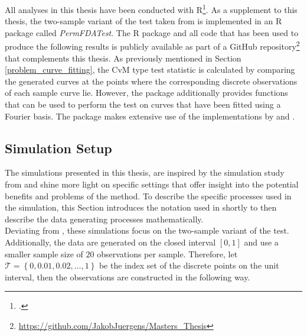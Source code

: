 \documentclass[12pt, a4paper]{article}
\theoremstyle{MAstyle} \newtheorem{assumption}{Assumption}[section]
\theoremstyle{MAstyle} \newtheorem{definition}{Definition}[section]
\theoremstyle{MAstyle} \newtheorem{theorem}{Theorem}[section]
\begin{document}
		All analyses in this thesis have been conducted with R\footcite{R}. As a supplement to this thesis, the two-sample variant of the test taken from \cite{bugni_permutation_2021} is implemented in an R package called \textit{PermFDATest}. The R package and all code that has been used to produce the following results is publicly available as part of a GitHub repository\footnote{\href{https://github.com/JakobJuergens/Masters_Thesis}{https://github.com/JakobJuergens/Masters\_Thesis}} that complements this thesis. As previously mentioned in Section \ref{problem_curve_fitting}, the CvM type test statistic is calculated by comparing the generated curves at the points where the corresponding discrete observations of each sample curve lie. However, the package additionally provides functions that can be used to perform the test on curves that have been fitted using a Fourier basis.
		The package makes extensive use of the implementations by \cite{fda} and \cite{tidyverse}.

		\subsection{Simulation Setup}
		The simulations presented in this thesis, are inspired by the simulation study from \cite{bugni_permutation_2021} and shine more light on specific settings that offer insight into the potential benefits and problems of the method. 
		To describe the specific processes used in the simulation, this Section introduces the notation used in \cite{bugni_permutation_2021} shortly to then describe the data generating processes mathematically. \\
		
		Deviating from \cite{bugni_permutation_2021}, these simulations focus on the two-sample variant of the test. Additionally, the data are generated on the closed interval $\left[0,1\right]$ and use a smaller sample size of $20$ observations per sample. Therefore, let $\mathcal{T} = \left\{0, 0.01, 0.02, \dots, 1\right\}$ be the index set of the discrete points on the unit interval, then the observations are constructed in the following way.\\
		
\end{document}
